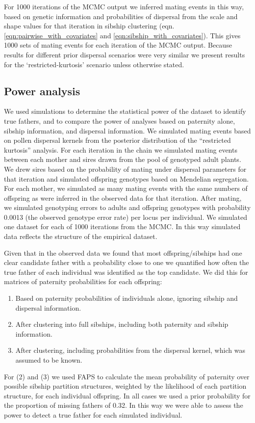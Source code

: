 \documentclass[10pt, a4paper, twocolumn]{article} %
\begin{document}
For 1000 iterations of the MCMC output we inferred mating events in this way, based on genetic information and probabilities of dispersal from the scale and shape values for that iteration in sibship clustering (eqn. \ref{eqn:pairwise_with_covariates} and \ref{eqn:sibship_with_covariates}). This gives 1000 sets of mating events for each iteration of the MCMC output. Because results for different prior dispersal scenarios were very similar we present results for the ‘restricted-kurtosis’ scenario unless otherwise stated.

\subsection{Power analysis}

We used simulations to determine the statistical power of the dataset to identify true fathers, and to compare the power of analyses based on paternity alone, sibship information, and dispersal information. We simulated mating events based on pollen dispersal kernels from the posterior distribution of the “restricted kurtosis” analysis. For each iteration in the chain we simulated mating events between each mother and sires drawn from the pool of genotyped adult plants. We drew sires based on the probability of mating under dispersal parameters for that iteration and simulated offspring genotypes based on Mendelian segregation. For each mother, we simulated as many mating events with the same numbers of offspring as were inferred in the observed data for that iteration. After mating, we simulated genotyping errors to adults and offspring genotypes with probability 0.0013 (the observed genotype error rate) per locus per individual. We simulated one dataset for each of 1000 iterations from the MCMC. In this way simulated data reflects the structure of the empirical dataset.

Given that in the observed data we found that most offspring/sibships had one clear candidate father with a probability close to one we quantified how often the true father of each individual was identified as the top candidate. We did this for matrices of paternity probabilities for each offspring:
\begin{enumerate}
\item Based on paternity probabilities of individuals alone, ignoring sibship and dispersal information.
\item After clustering into full sibships, including both paternity and sibship information.
\item After clustering, including probabilities from the dispersal kernel, which was assumed to be known.
\end{enumerate}
For (2) and (3) we used FAPS to calculate the mean probability of paternity over possible sibship partition structures, weighted by the likelihood of each partition structure, for each individual offspring. In all cases we used a prior probability for the proportion of missing fathers of 0.32. In this way we were able to assess the power to detect a true father for each simulated individual.
\end{document}

